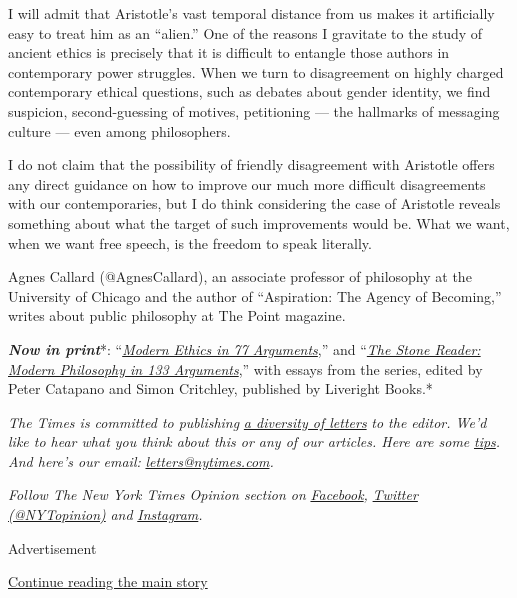 I will admit that Aristotle's vast temporal distance from us makes it
artificially easy to treat him as an ``alien.'' One of the reasons I
gravitate to the study of ancient ethics is precisely that it is
difficult to entangle those authors in contemporary power struggles.
When we turn to disagreement on highly charged contemporary ethical
questions, such as debates about gender identity, we find suspicion,
second-guessing of motives, petitioning --- the hallmarks of messaging
culture --- even among philosophers.

I do not claim that the possibility of friendly disagreement with
Aristotle offers any direct guidance on how to improve our much more
difficult disagreements with our contemporaries, but I do think
considering the case of Aristotle reveals something about what the
target of such improvements would be. What we want, when we want free
speech, is the freedom to speak literally.

Agnes Callard (@AgnesCallard), an associate professor of philosophy at
the University of Chicago and the author of ``Aspiration: The Agency of
Becoming,'' writes about public philosophy at The Point magazine.

\emph{\textbf{Now in print}}*:
``\emph{\href{http://bitly.com/1MW2kN3}{\emph{Modern Ethics in 77
Arguments}}},'' and ``\emph{\href{http://bitly.com/1MW2kN3}{\emph{The
Stone Reader: Modern Philosophy in 133 Arguments}}},'' with essays from
the series, edited by Peter Catapano and Simon Critchley, published by
Liveright Books.*

\emph{The Times is committed to publishing}
\href{https://www.nytimes.com/2019/01/31/opinion/letters/letters-to-editor-new-york-times-women.html}{\emph{a
diversity of letters}} \emph{to the editor. We'd like to hear what you
think about this or any of our articles. Here are some}
\href{https://help.nytimes.com/hc/en-us/articles/115014925288-How-to-submit-a-letter-to-the-editor}{\emph{tips}}\emph{.
And here's our email:}
\href{mailto:letters@nytimes.com}{\emph{letters@nytimes.com}}\emph{.}

\emph{Follow The New York Times Opinion section on}
\href{https://www.facebook.com/nytopinion}{\emph{Facebook}}\emph{,}
\href{http://twitter.com/NYTOpinion}{\emph{Twitter (@NYTopinion)}}
\emph{and}
\href{https://www.instagram.com/nytopinion/}{\emph{Instagram}}\emph{.}

Advertisement

\protect\hyperlink{after-bottom}{Continue reading the main story}

